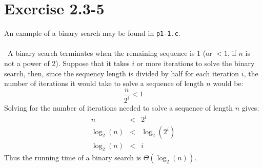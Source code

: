\documentclass{article}
\begin{document}
\section*{Exercise 2.3-5}

An example of a binary search may be found in \texttt{p1-1.c}.
\\ \\
\noindent~A binary search terminates when the remaining sequence is 1 (or $< 1$, if $n$ is not a power of 2). Suppose that it takes $i$ or more iterations to solve the binary search, then, since the sequency length is divided by half for each iteration $i$, the number of iterations it would take to solve a sequence of length $n$ would be:
\begin{equation*}
	\frac{n}{2^i} < 1
\end{equation*}
Solving for the number of iterations needed to solve a sequence of length $n$ gives:
\begin{eqnarray*}
	n & < & 2^i \\
	\log_2(n) & < & \log_2(2^i) \\
	\log_2(n) & < & i
\end{eqnarray*}
Thus the running time of a binary search is $\Theta(\log_2(n))$.
\end{document}
